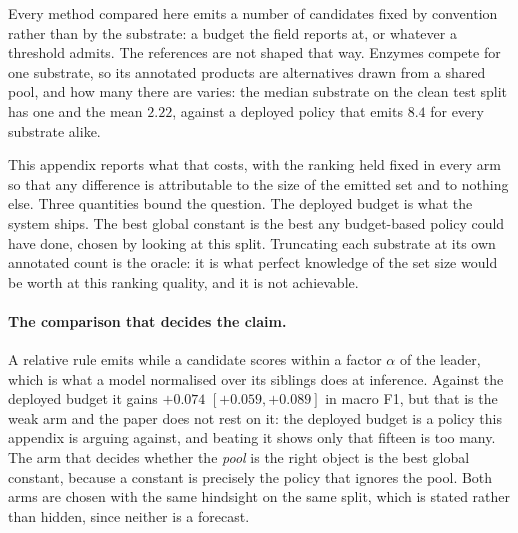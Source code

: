 \label{app:emissionrule}

Every method compared here emits a number of candidates fixed by convention rather than by the
substrate: a budget the field reports at, or whatever a threshold admits. The references are not
shaped that way. Enzymes compete for one substrate, so its annotated products are alternatives drawn
from a shared pool, and how many there are varies: the median substrate on the clean test split has
one and the mean $2.22$, against a deployed policy that emits $8.4$ for every substrate alike.

This appendix reports what that costs, with the ranking held fixed in every arm so that any
difference is attributable to the size of the emitted set and to nothing else. Three quantities
bound the question. The deployed budget is what the system ships. The best global constant is the
best any budget-based policy could have done, chosen by looking at this split. Truncating each
substrate at its own annotated count is the oracle: it is what perfect knowledge of the set size
would be worth at this ranking quality, and it is not achievable.

\paragraph{The comparison that decides the claim.} A relative rule emits while a candidate scores
within a factor $\alpha$ of the leader, which is what a model normalised over its siblings does at
inference. Against the deployed budget it gains $+0.074$ $[+0.059,+0.089]$ in macro F1, but that is
the weak arm and the paper does not rest on it: the deployed budget is a policy this appendix is
arguing against, and beating it shows only that fifteen is too many. The arm that decides whether
the \emph{pool} is the right object is the best global constant, because a constant is precisely the
policy that ignores the pool. Both arms are chosen with the same hindsight on the same split, which
is stated rather than hidden, since neither is a forecast.

